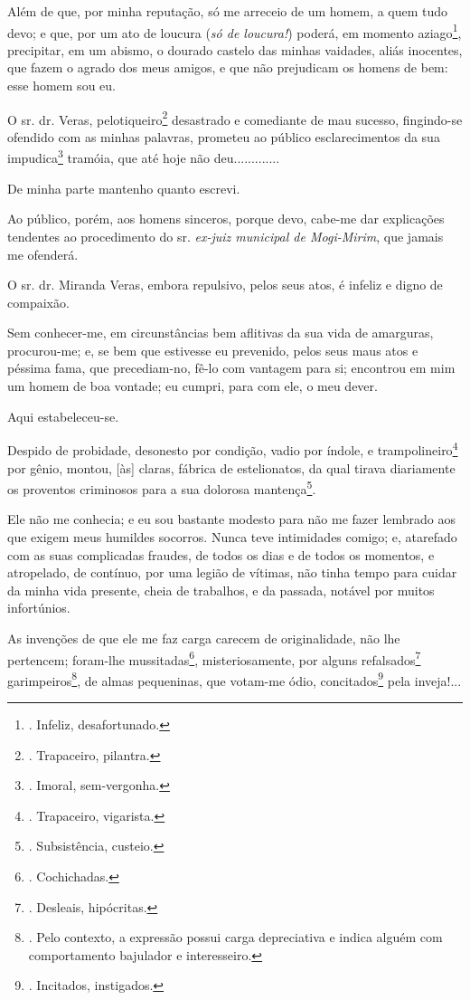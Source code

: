 Além de que, por minha reputação, só me arreceio de um homem, a quem
tudo devo; e que, por um ato de loucura (\emph{só de loucura!}) poderá,
em momento aziago\footnote{. Infeliz, desafortunado.}, precipitar, em um
abismo, o dourado castelo das minhas vaidades, aliás inocentes, que
fazem o agrado dos meus amigos, e que não prejudicam os homens de bem:
esse homem sou eu.

O sr. dr. Veras, pelotiqueiro\footnote{. Trapaceiro, pilantra.}
desastrado e comediante de mau sucesso, fingindo-se ofendido com as
minhas palavras, prometeu ao público esclarecimentos da sua
impudica\footnote{. Imoral, sem-vergonha.} tramóia, que até hoje não
deu.............

De minha parte mantenho quanto escrevi.

Ao público, porém, aos homens sinceros, porque devo, cabe-me dar
explicações tendentes ao procedimento do sr. \emph{ex-juiz municipal de
Mogi-Mirim}, que jamais me ofenderá.

O sr. dr. Miranda Veras, embora repulsivo, pelos seus atos, é infeliz e
digno de compaixão.

Sem conhecer-me, em circunstâncias bem aflitivas da sua vida de
amarguras, procurou-me; e, se bem que estivesse eu prevenido, pelos seus
maus atos e péssima fama, que precediam-no, fê-lo com vantagem para si;
encontrou em mim um homem de boa vontade; eu cumpri, para com ele, o meu
dever.

Aqui estabeleceu-se.

Despido de probidade, desonesto por condição, vadio por índole, e
trampolineiro\footnote{. Trapaceiro, vigarista.} por gênio, montou,
{[}às{]} claras, fábrica de estelionatos, da qual tirava diariamente os
proventos criminosos para a sua dolorosa mantença\footnote{.
  Subsistência, custeio.}.

Ele não me conhecia; e eu sou bastante modesto para não me fazer
lembrado aos que exigem meus humildes socorros. Nunca teve intimidades
comigo; e, atarefado com as suas complicadas fraudes, de todos os dias e
de todos os momentos, e atropelado, de contínuo, por uma legião de
vítimas, não tinha tempo para cuidar da minha vida presente, cheia de
trabalhos, e da passada, notável por muitos infortúnios.

As invenções de que ele me faz carga carecem de originalidade, não lhe
pertencem; foram-lhe mussitadas\footnote{. Cochichadas.},
misteriosamente, por alguns refalsados\footnote{. Desleais, hipócritas.}
garimpeiros\footnote{. Pelo contexto, a expressão possui carga
  depreciativa e indica alguém com comportamento bajulador e
  interesseiro.}, de almas pequeninas, que votam-me ódio,
concitados\footnote{. Incitados, instigados.} pela inveja!...

